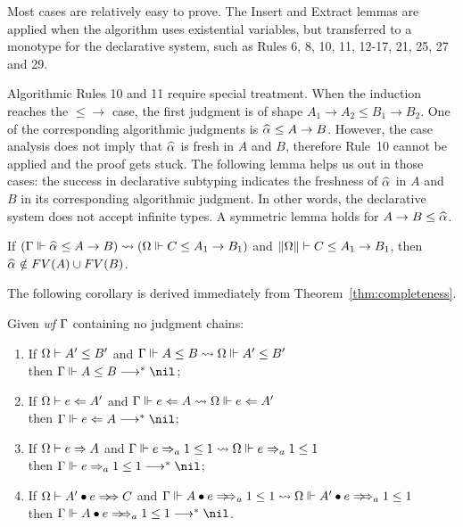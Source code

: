 Most cases are relatively easy to prove.
The Insert and Extract lemmas are applied when the algorithm uses existential variables,
but transferred to a monotype for the declarative system,
such as Rules 6, 8, 10, 11, 12-17, 21, 25, 27 and 29.

Algorithmic Rules 10 and 11 require special treatment.
When the induction reaches the $\mathtt{{\le}{\to}}$ case,
the first judgment is of shape $A_1 \to A_2 \le B_1 \to B_2$.
One of the corresponding algorithmic judgments is $\al \le A \to B$.
However, the case analysis does not imply that $\al$ is fresh in $A$ and $B$,
therefore Rule~10 cannot be applied and the proof gets stuck.
The following lemma helps us out in those cases:
the success in declarative subtyping indicates the freshness of $\al$ in $A$ and $B$
in its corresponding algorithmic judgment.
In other words, the declarative system does not accept infinite types.
A symmetric lemma holds for $A\to B \le \al$.

\begin{lemma}\label{lem:prune_inst}
If $(\Gm \Vdash \al \le A \to B) \sto (\Om \Vdash C \le A_1 \to B_1)$ and
$\|\Omega\| \vdash C \le A_1 \to B_1$, then $\al\notin FV(A) \cup FV(B)$.
\end{lemma}

The following corollary is derived immediately from Theorem~\ref{thm:completeness}.
\begin{corollary}
Given \emph{wf }$\Gamma$ containing no judgment chains:
\begin{enumerate}
    \item If $\Omega \vdash A' \le B'$ and $\Gamma \Vdash A \le B \rightsquigarrow \Omega \Vdash A' \le B'$
        \\then $\Gm \Vdash A \le B \redto \nil$;
    \item If $\Omega \vdash e \Leftarrow A'$ and $\Gamma \Vdash e \Leftarrow A \rightsquigarrow \Omega \Vdash e \Leftarrow A'$
        \\then $\Gm \Vdash e \Lto A \redto \nil$;
    \item If $\Omega \vdash e \Rightarrow A$ and $\Gamma \Vdash e \Rightarrow_a 1 \le 1 \rightsquigarrow \Omega \Vdash e \Rightarrow_a 1 \le 1$
        \\then $\Gm \Vdash e \To_a 1 \le 1 \redto \nil$;
    \item If $\Om \vdash \appInf{A'}{e}{C}$ and
        $\Gm \Vdash \appInfAlg{A}{e}[a][1 \le 1] \sto \Om \Vdash \appInfAlg{A'}{e}[a][1 \le 1]$
        \\then $\Gm \Vdash \appInfAlg{A}{e}[a][1 \le 1] \redto \nil$.
\end{enumerate}
\end{corollary}

